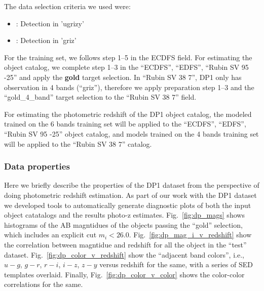 The data selection criteria we used were:
\begin{itemize}
\item{: Detection in 'ugrizy' }
\item{: Detection in 'griz' }
\end{itemize}

For the training set, we follows step 1--5 in the ECDFS field. For estimating the object catalog, we complete step 1--3 in the ``ECDFS'', ``EDFS'', ``Rubin SV 95 -25'' and apply the \textbf{gold} target selection. In ``Rubin SV 38 7'', DP1 only has observation in 4 bands (``griz''), therefore we apply preparation step 1--3 and the ``gold\_4\_band'' target selection to the ``Rubin SV 38 7'' field. 

For estimating the photometric redshift of the DP1 object catalog, the modeled trained on the 6 bands training set will be applied to the ``ECDFS'', ``EDFS'', ``Rubin SV 95 -25'' object catalog, and models trained on the 4 bands training set will be applied to the ``Rubin SV 38 7'' catalog. 


\subsubsection{Data properties}
\label{sec:data:dp1:properties}

Here we briefly describe the properties of the DP1 dataset from the perspective of doing photometric redshift estimation.   As part of our work with the DP1 dataset we developed tools to automatically generate diagnostic plots of both the input object catatalogs and the results photo-z estimates.
Fig.~\ref{fig:dp_mags} shows histograms of the AB magntidues of the objects passing the ``gold'' selection,  which includes an explicit cut $m_{i} < 26.0$.   Fig.~\ref{fig:dp_mag_i_v_redshift} show the correlation between magntidue and redshift for all the object in the ``test'' dataset.   Fig.~\ref{fig:dp_color_v_redshift} show the ``adjacent band colors'', i.e., $u-g$, $g-r$, $r-i$, $i-z$, $z-y$ versus redshift for the same, with a series of SED templates overlaid.  Finally, Fig.~\ref{fig:dp_color_v_color} shows the color-color correlations for the same.

